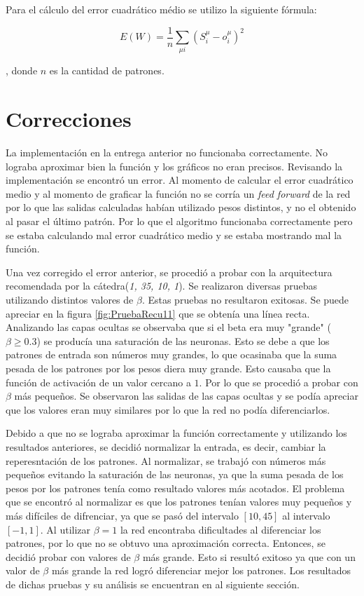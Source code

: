 \documentclass[11pt,a4paper]{article}
\begin{document}
Para el cálculo del error cuadrático médio se utilizo la siguiente fórmula:

$$E(W) = \frac{1}{n} \sum_{\mu i}{(S_i^{\mu} - o_i^{\mu})^2}$$

, donde $n$ es la cantidad de patrones.

\section{Correcciones}

La implementación en la entrega anterior no funcionaba correctamente. No lograba aproximar bien la función y los gráficos no eran precisos. Revisando la implementación se encontró un error. Al momento de calcular el error cuadrático medio y al momento de graficar la función no se corría un \emph{feed forward} de la red por lo que las salidas calculadas habían utilizado pesos distintos, y no el obtenido al pasar el último patrón. Por lo que el algoritmo funcionaba correctamente pero se estaba calculando mal error cuadrático medio y se estaba mostrando mal la función.

Una vez corregido el error anterior, se procedió a probar con la arquitectura recomendada por la cátedra(\emph{1, 35, 10, 1}). Se realizaron diversas pruebas utilizando distintos valores de $\beta$. Estas pruebas no resultaron exitosas. Se puede apreciar en la figura \ref{fig:PruebaRecu11} que se obtenía una línea recta. Analizando las capas ocultas se observaba que si el beta era muy "grande" ($\beta \geq 0.3$) se producía una saturación de las neuronas. Esto se debe a que los patrones de entrada son números muy grandes, lo que ocasinaba que la suma pesada de los patrones por los pesos diera muy grande. Esto causaba que la función de activación de un valor cercano a $1$. Por lo que se procedió a probar con $\beta$ más pequeños. Se observaron las salidas de las capas ocultas y se podía apreciar que los valores eran muy similares por lo que la red no podía diferenciarlos.

Debido a que no se lograba aproximar la función correctamente y utilizando los resultados anteriores, se decidió normalizar la entrada, es decir, cambiar la reperesntación de los patrones. Al normalizar, se trabajó con números más pequeños evitando la saturación de las neuronas, ya que la suma pesada de los pesos por los patrones tenía como resultado valores más acotados. El problema que se encontró al normalizar es que los patrones tenían valores muy pequeños y más difíciles de difrenciar, ya que se pasó del intervalo $[10,45]$ al intervalo $[-1,1]$. Al utilizar $\beta = 1$ la red encontraba dificultades al diferenciar los patrones, por lo que no se obtuvo una aproximación correcta. Entonces, se decidió probar con valores de $\beta$ más grande. Esto si resultó exitoso ya que con un valor de $\beta$ más grande la red logró diferenciar mejor los patrones. Los resultados de dichas pruebas y su análisis se encuentran en al siguiente sección.
\end{document}
